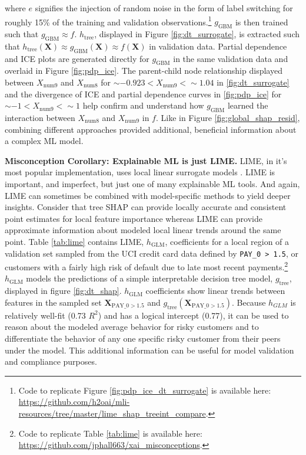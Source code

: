 \documentclass[fleqn]{article}
\begin{document}
\noindent where $e$ signifies the injection of random noise in the form of label switching for roughly 15\% of the training and validation observations.\footnote{Code to replicate Figure \ref{fig:pdp_ice_dt_surrogate} is available here: \url{https://github.com/h2oai/mli-resources/tree/master/lime_shap_treeint_compare}.} $g_{\text{GBM}}$ is then trained such that $g_{\text{GBM}} \approx f$. $h_{\text{tree}}$, displayed in Figure \ref{fig:dt_surrogate}, is extracted such that $h_{\text{tree}}(\mathbf{X}) \approx g_{\text{GBM}}(\mathbf{X}) \approx f(\mathbf{X})$ in validation data. Partial dependence and ICE plots are generated directly for $g_{\text{GBM}}$ in the same validation data and overlaid in Figure \ref{fig:pdp_ice}. The parent-child node relationship displayed between $X_{\text{num9}}$ and $X_{\text{num8}}$ for $\sim -0.923 < X_{\text{num9}} <  \sim 1.04$ in \ref{fig:dt_surrogate} and the divergence of ICE and partial dependence curves in \ref{fig:pdp_ice} for $\sim -1 < X_{\text{num9}} <  \sim 1$ help confirm and understand how $g_{\text{GBM}}$ learned the interaction between $X_{\text{num}8}$ and $X_{\text{num}9}$ in $f$. Like in Figure \ref{fig:global_shap_resid}, combining different approaches provided additional, beneficial information about a complex ML model. %


\textbf{Misconception Corollary: Explainable ML is just LIME.} LIME, in it's most popular implementation, uses local linear surrogate models \cite{lime}. LIME is important, and imperfect, but just one of many explainable ML tools. And again, LIME can sometimes be combined with model-specific methods to yield deeper insights. Consider that tree SHAP can provide locally accurate and consistent point estimates for local feature importance whereas LIME can provide approximate information about modeled local linear trends around the same point. Table \ref{tab:lime} contains LIME, $h_{\text{GLM}}$, coefficients for a local region of a validation set sampled from the UCI credit card data defined by \texttt{PAY\_0 > 1.5}, or customers with a fairly high risk of default due to late most recent payments.\footnote{Code to replicate Table \ref{tab:lime} is available here: \url{https://github.com/jphall663/xai_misconceptions}.} $h_{\text{GLM}}$ models the predictions of a simple interpretable decision tree model, $g_{\text{tree}}$, displayed in figure \ref{fig:dt_shap}. $h_{\text{GLM}}$ coefficients show linear trends between features in the sampled set $\mathbf{X}_{\text{PAY\_0} > 1.5}$ and $g_{\text{tree}}(\mathbf{X}_{\text{PAY\_0}> 1.5})$. Because $h_{GLM}$ is relatively well-fit (0.73 $R^2$) and has a logical intercept (0.77), it can be used to reason about the modeled average behavior for risky customers and to differentiate the behavior of any one specific risky customer from their peers under the model. This additional information can be useful for model validation and compliance purposes.
\end{document}
